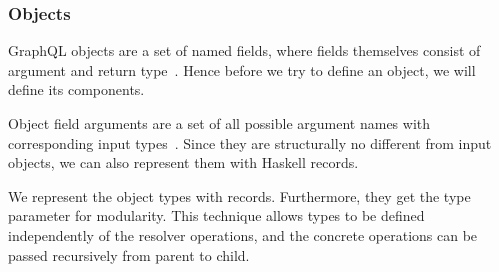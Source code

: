 \begin{frame}\frametitle{Objects}

GraphQL objects are a set of named fields, where fields themselves consist of argument and return type~\cite{gql-spec}. Hence before we try to define an object, we will define its components.

Object field arguments are a set of all possible argument names with corresponding input types~\cite{gql-spec}. Since they are structurally no different from input objects, we can also represent them with Haskell records. 


We represent the object types with records. Furthermore, they get the type parameter  for modularity.
This technique allows types to be defined independently of the resolver operations, and the concrete operations can be passed recursively from parent to child. 


\end{frame}

